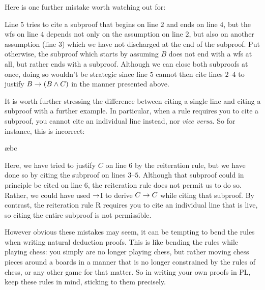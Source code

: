 Here is one further mistake worth watching out for:
\begin{fitchproof}
 \pr{}
\open
	 
	\open
		 
	\close
\close
\end{fitchproof}
Line $5$ tries to cite a subproof that begins on line $2$ and ends on line $4$, but the wfs on line $4$ depends not only on the assumption on line $2$, but also on another assumption (line $3$) which we have not discharged at the end of the subproof.
Put otherwise, the subproof which starts by assuming $B$ does not end with a wfs at all, but rather ends with a subproof. 
Although we can close both subproofs at once, doing so wouldn't be strategic since line $5$ cannot then cite lines $2$--$4$ to justify $B \rightarrow (B \wedge C)$ in the manner presented above.

It is worth further stressing the difference between citing a single line and citing a subproof with a further example.
In particular, when a rule requires you to cite a subproof, you cannot cite an individual line instead, nor \textit{vice versa}.
So for instance, this is incorrect:
\begin{fitchproof}
 \pr{}
\open
	 
	\open
		 
	\ae{bc}
	\close
\close
{}
\end{fitchproof}
Here, we have tried to justify $C$ on line $6$ by the reiteration rule, but we have done so by citing the subproof on lines $3$--$5$.
Although that subproof could in principle be cited on line $6$, the reiteration rule does not permit us to do so.
Rather, we could have used $\rightarrow$I to derive $C \rightarrow C$ while citing that subproof.
By contrast, the reiteration rule R requires you to cite an individual line that is live, so citing the entire subproof is not permissible.

However obvious these mistakes may seem, it can be tempting to bend the rules when writing natural deduction proofs.
This is like bending the rules while playing chess: you simply are no longer playing chess, but rather moving chess pieces around a boards in a manner that is no longer constrained by the rules of chess, or any other game for that matter.
So in writing your own proofs in PL, keep these rules in mind, sticking to them precisely.








